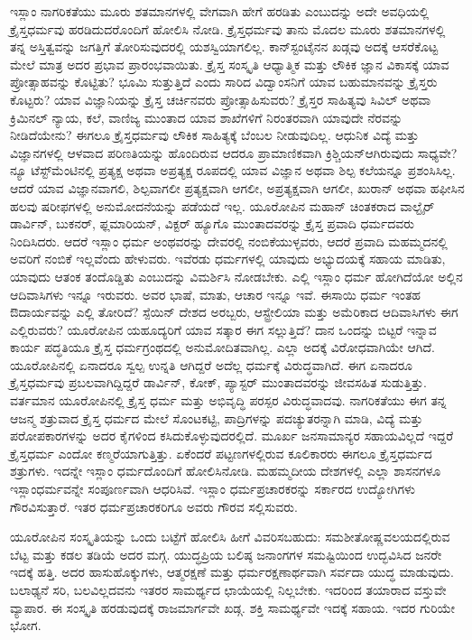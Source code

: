 ಇಸ್ಲಾಂ ನಾಗರಿಕತೆಯು ಮೂರು ಶತಮಾನಗಳಲ್ಲಿ ವೇಗವಾಗಿ ಹೇಗೆ ಹರಡಿತು ಎಂಬುದನ್ನು ಅದೇ ಅವಧಿಯಲ್ಲಿ ಕ್ರೈಸ್ತಧರ್ಮವು ಹರಡಿದುದರೊಂದಿಗೆ ಹೋಲಿಸಿ ನೋಡಿ. ಕ್ರೈಸ್ತಧರ್ಮವು ತಾನು ಮೊದಲ ಮೂರು ಶತಮಾನಗಳಲ್ಲಿ ತನ್ನ ಅಸ್ತಿತ್ವವನ್ನು ಜಗತ್ತಿಗೆ ತೋರಿಸುವುದರಲ್ಲಿ ಯಶಸ್ವಿಯಾಗಲಿಲ್ಲ. ಕಾನ್​ಸ್ಟಂಟೈನನ ಖಡ್ಗವು ಅದಕ್ಕೆ ಆಸರೆಕೊಟ್ಟ ಮೇಲೆ ಮಾತ್ರ ಅದರ ಪ್ರಭಾವ ಪ್ರಾರಂಭವಾಯಿತು. ಕ್ರೈಸ್ತ ಸಂಸ್ಕೃತಿ ಆಧ್ಯಾತ್ಮಿಕ ಮತ್ತು ಲೌಕಿಕ ಜ್ಞಾನ ವಿಕಾಸಕ್ಕೆ ಯಾವ ಪ್ರೋತ್ಸಾಹವನ್ನು ಕೊಟ್ಟಿತು? ಭೂಮಿ ಸುತ್ತುತ್ತಿದೆ ಎಂದು ಸಾರಿದ ವಿದ್ವಾಂಸನಿಗೆ ಯಾವ ಬಹುಮಾನವನ್ನು ಕ್ರೈಸ್ತರು ಕೊಟ್ಟರು? ಯಾವ ವಿಜ್ಞಾನಿಯನ್ನು ಕ್ರೈಸ್ತ ಚರ್ಚಿನವರು ಪ್ರೋತ್ಸಾಹಿಸುವರು? ಕ್ರೈಸ್ತರ ಸಾಹಿತ್ಯವು ಸಿವಿಲ್​ ಅಥವಾ ಕ್ರಿಮಿನಲ್​ ನ್ಯಾಯ, ಕಲೆ, ವಾಣಿಜ್ಯ ಮುಂತಾದ ಯಾವ ಶಾಖೆಗಳಿಗೆ ನಿರಂತರವಾಗಿ ಯಾವುದೇ ನೆರವನ್ನು ನೀಡಿದೆಯೇನು? ಈಗಲೂ ಕ್ರೈಸ್ತಧರ್ಮವು ಲೌಕಿಕ ಸಾಹಿತ್ಯಕ್ಕೆ ಬೆಂಬಲ ನೀಡುವುದಿಲ್ಲ. ಆಧುನಿಕ ವಿದ್ಯೆ ಮತ್ತು ವಿಜ್ಞಾನಗಳಲ್ಲಿ ಆಳವಾದ ಪರಿಣತಿಯನ್ನು ಹೊಂದಿರುವ ಆದರೂ ಪ್ರಾಮಾಣಿಕವಾಗಿ ಕ್ರಿಶ್ಚಿಯನ್​ ಆಗಿರುವುದು ಸಾಧ್ಯವೇ? ನ್ಯೂ ಟೆಸ್ಟ್​ಮೆಂಟಿನಲ್ಲಿ ಪ್ರತ್ಯಕ್ಷ ಅಥವಾ ಅಪ್ರತ್ಯಕ್ಷ ರೂಪದಲ್ಲಿ ಯಾವ ವಿಜ್ಞಾನ ಅಥವಾ ಶಿಲ್ಪ ಕಲೆಯನ್ನೂ ಪ್ರಶಂಸಿಸಿಲ್ಲ. ಆದರೆ ಯಾವ ವಿಜ್ಞಾನವಾಗಲಿ, ಶಿಲ್ಪವಾಗಲೀ ಪ್ರತ್ಯಕ್ಷವಾಗಿ ಆಗಲೀ, ಅಪ್ರತ್ಯಕ್ಷವಾಗಿ ಆಗಲೀ, ಖುರಾನ್​ ಅಥವಾ ಹಫೀಸಿನ ಹಲವು ಷರೀಫಗಳಲ್ಲಿ ಅನುಮೋದನೆಯನ್ನು ಪಡೆಯದೆ ಇಲ್ಲ. ಯೂರೋಪಿನ ಮಹಾನ್​ ಚಿಂತಕರಾದ ವಾಲ್ಟೈರ್​ ಡಾರ್ವಿನ್​, ಬುಕನರ್​, ಫ್ಲಮಾರಿಯನ್​, ವಿಕ್ಟರ್​ ಹ್ಯೂಗೊ ಮುಂತಾದವರನ್ನು ಕ್ರೈಸ್ತ ಪ್ರವಾದಿ ಧರ್ಮದವರು ನಿಂದಿಸಿದರು. ಆದರೆ ಇಸ್ಲಾಂ ಧರ್ಮ ಅಂಥವರನ್ನು ದೇವರಲ್ಲಿ ನಂಬಿಕೆಯುಳ್ಳವರು, ಆದರೆ ಪ್ರವಾದಿ ಮಹಮ್ಮದನಲ್ಲಿ ಅವರಿಗೆ ನಂಬಿಕೆ ಇಲ್ಲವೆಂದು ಹೇಳುವರು. ಇವೆರಡು ಧರ್ಮಗಳಲ್ಲಿ ಯಾವುದು ಅಭ್ಯುದಯಕ್ಕೆ ಸಹಾಯ ಮಾಡಿತು, ಯಾವುದು ಆತಂಕ ತಂದೊಡ್ಡಿತು ಎಂಬುದನ್ನು ವಿಮರ್ಶಿಸಿ ನೋಡಬೇಕು. ಎಲ್ಲಿ ಇಸ್ಲಾಂ ಧರ್ಮ ಹೋಗಿದೆಯೋ ಅಲ್ಲಿನ ಆದಿವಾಸಿಗಳು ಇನ್ನೂ ಇರುವರು. ಅವರ ಭಾಷೆ, ಮಾತು, ಆಚಾರ ಇನ್ನೂ ಇವೆ. ಈಸಾಯಿ ಧರ್ಮ ಇಂತಹ ಔದಾರ್ಯವನ್ನು ಎಲ್ಲಿ ತೋರಿದೆ? ಸ್ಪೆಯಿನ್​ ದೇಶದ ಅರಬ್ಬರು, ಆಸ್ಟ್ರೇಲಿಯಾ ಮತ್ತು ಅಮೆರಿಕಾದ ಆದಿವಾಸಿಗಳು ಈಗ ಎಲ್ಲಿರುವರು? ಯೂರೋಪಿನ ಯಹೂದ್ಯರಿಗೆ ಯಾವ ಸತ್ಕಾರ ಈಗ ಸಲ್ಲುತ್ತಿದೆ? ದಾನ ಒಂದನ್ನು ಬಿಟ್ಟರೆ ಇನ್ನಾವ ಕಾರ್ಯ ಪದ್ಧತಿಯೂ ಕ್ರೈಸ್ತ ಧರ್ಮಗ್ರಂಥದಲ್ಲಿ ಅನುಮೋದಿತವಾಗಿಲ್ಲ. ಎಲ್ಲಾ ಅದಕ್ಕೆ ವಿರೋಧವಾಗಿಯೇ ಆಗಿದೆ. ಯೂರೋಪಿನಲ್ಲಿ ಏನಾದರೂ ಸ್ವಲ್ಪ ಉನ್ನತಿ ಆಗಿದ್ದರೆ ಅದೆಲ್ಲ ಧರ್ಮಕ್ಕೆ ವಿರುದ್ಧವಾಗಿದೆ. ಈಗ ಏನಾದರೂ ಕ್ರೈಸ್ತಧರ್ಮವು ಪ್ರಬಲವಾಗಿದ್ದಿದ್ದರೆ ಡಾರ್ವಿನ್​, ಕೋಕ್​, ಪ್ಯಾಸ್ಟರ್​ ಮುಂತಾದವರನ್ನು ಜೀವಸಹಿತ ಸುಡುತ್ತಿತ್ತು. ವರ್ತಮಾನ ಯೂರೋಪಿನಲ್ಲಿ ಕ್ರೈಸ್ತ ಧರ್ಮ ಮತ್ತು ಅಭಿವೃದ್ಧಿ ಪರಸ್ಪರ ವಿರುದ್ಧವಾದವು. ನಾಗರಿಕತೆಯು ಈಗ ತನ್ನ ಆಜನ್ಮ ಶತ್ರುವಾದ ಕ್ರೈಸ್ತ ಧರ್ಮದ ಮೇಲೆ ಸೊಂಟಕಟ್ಟಿ, ಪಾದ್ರಿಗಳನ್ನು ಪದಚ್ಯುತರನ್ನಾಗಿ ಮಾಡಿ, ವಿದ್ಯೆ ಮತ್ತು ಪರೋಪಕಾರಗಳನ್ನು ಅದರ ಕೈಗಳಿಂದ ಕಸಿದುಕೊಳ್ಳುವುದರಲ್ಲಿದೆ. ಮೂರ್ಖ ಜನಸಾಮಾನ್ಯರ ಸಹಾಯವಿಲ್ಲದೆ ಇದ್ದರೆ ಕ್ರೈಸ್ತಧರ್ಮ ಎಂದೋ ಕಣ್ಮರೆಯಾಗುತ್ತಿತ್ತು. ಏಕೆಂದರೆ ಪಟ್ಟಣಗಳಲ್ಲಿರುವ ಕೂಲಿಕಾರರು ಈಗಲೂ ಕ್ರೈಸ್ತಧರ್ಮದ ಶತ್ರುಗಳು. ಇದನ್ನೇ ಇಸ್ಲಾಂ ಧರ್ಮದೊಂದಿಗೆ ಹೋಲಿಸಿನೋಡಿ. ಮಹಮ್ಮದೀಯ ದೇಶಗಳಲ್ಲಿ ಎಲ್ಲಾ ಶಾಸನಗಳೂ ಇಸ್ಲಾಂಧರ್ಮವನ್ನೇ ಸಂಪೂರ್ಣವಾಗಿ ಆಧರಿಸಿವೆ. ಇಸ್ಲಾಂ ಧರ್ಮಪ್ರಚಾರಕರನ್ನು ಸರ್ಕಾರದ ಉದ್ಯೋಗಿಗಳು ಗೌರವಿಸುತ್ತಾರೆ. ಇತರ ಧರ್ಮಪ್ರಚಾರಕರಿಗೂ ಅವರು ಗೌರವ ಸಲ್ಲಿಸುವರು.

ಯೂರೋಪಿನ ಸಂಸ್ಕೃತಿಯನ್ನು ಒಂದು ಬಟ್ಟೆಗೆ ಹೋಲಿಸಿ ಹೀಗೆ ವಿವರಿಸಬಹುದು: ಸಮಶೀತೋಷ್ಣವಲಯದಲ್ಲಿರುವ ಬೆಟ್ಟ ಮತ್ತು ಕಡಲ ತಡಿಯೆ ಅದರ ಮಗ್ಗ. ಯುದ್ಧಪ್ರಿಯ ಬಲಿಷ್ಠ ಜನಾಂಗಗಳ ಸಮಷ್ಟಿಯಿಂದ ಉದ್ಭವಿಸಿದ ಜನರೇ ಇದಕ್ಕೆ ಹತ್ತಿ. ಅದರ ಹಾಸುಹೊಕ್ಕುಗಳು, ಆತ್ಮರಕ್ಷಣೆ ಮತ್ತು ಧರ್ಮರಕ್ಷಣಾರ್ಥವಾಗಿ ಸರ್ವದಾ ಯುದ್ಧ ಮಾಡುವುದು. ಬಲಾಢ್ಯನೆ ಸರಿ, ಬಲವಿಲ್ಲದವನು ಇತರರ ಸಾಮರ್ಥ್ಯದ ಛಾಯೆಯಲ್ಲಿ ನಿಲ್ಲಬೇಕು. ಇದರಿಂದ ತಯಾರಾದ ವಸ್ತುವೇ ವ್ಯಾಪಾರ. ಈ ಸಂಸ್ಕೃತಿ ಹರಡುವುದಕ್ಕೆ ರಾಜಮಾರ್ಗವೇ ಖಡ್ಗ. ಶಕ್ತಿ ಸಾಮರ್ಥ್ಯವೇ ಇದಕ್ಕೆ ಸಹಾಯ. ಇದರ ಗುರಿಯೇ ಭೋಗ.

